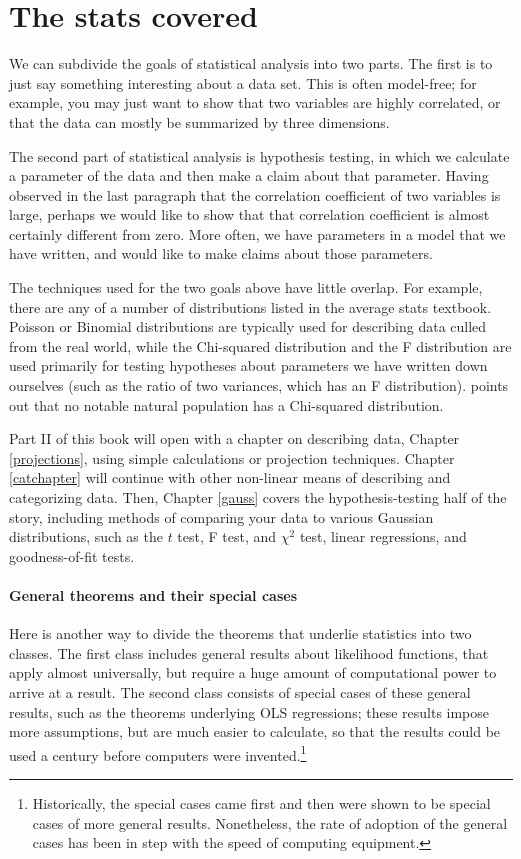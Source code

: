 \section{The stats covered} 
We can subdivide the goals of statistical analysis into two parts. The
first is to just say something interesting about a data set. This is often
model-free; for example, you may just want to show that two variables
are highly correlated, or that the data can mostly be summarized by three
dimensions.

The second part of statistical analysis is hypothesis testing, in which
we calculate a parameter of the data and then make a claim about that
parameter.  Having observed in the last paragraph that the correlation
coefficient of two variables is large, perhaps we would like to show
that that correlation coefficient is almost certainly different from
zero. More often, we have parameters in a model that we have written,
and would like to make claims about those parameters.

The techniques used for the two goals above have little overlap. For
example, there are any of a number of distributions listed in the
average stats textbook.  Poisson or Binomial distributions are typically used
for describing data culled from the real world, while the Chi-squared
distribution and the F distribution are used primarily for testing hypotheses
about parameters we have written down ourselves (such as the ratio of
two variances, which has an F distribution). \citet[p 141]{kmenta} points out
that no notable natural population has a Chi-squared distribution.

Part II of this book will open with a chapter on describing data,
Chapter \ref{projections}, using simple calculations or projection
techniques. Chapter \ref{catchapter} will continue with other non-linear
means of describing and categorizing data. Then, Chapter \ref{gauss}
covers the hypothesis-testing half of the story, including methods of
comparing your data to various Gaussian distributions, such as the $t$
test, F test, and $\chi^2$ test, linear regressions, and goodness-of-fit
tests.



\paragraph{General theorems and their special cases}
Here is another way to divide the theorems that underlie
statistics into two classes. The first class includes general
results about likelihood functions, that 
apply almost universally, but require a huge
amount of computational power to arrive at a result. The second class
consists of special cases of these general results, such as the theorems
underlying OLS regressions; these results impose more
assumptions, but are much easier to calculate, so that the results could
be used a century before computers were invented.\footnote{Historically,
the special cases came first and then were shown to be special cases of
more general results. Nonetheless, the rate of adoption of the general
cases has been in step with the speed of computing equipment.}


